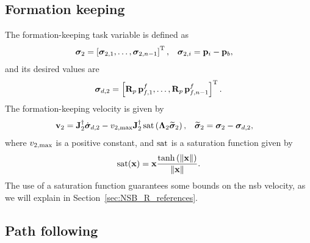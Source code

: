 \subsection{Formation keeping}
\label{sec:NSB_R_formation}
The formation-keeping task variable is defined as
\begin{align}
    \bm{\sigma}_2 &= \left[\bm{\sigma}_{2,1}, \ldots, \bm{\sigma}_{2,n-1}\right]^{\mathrm{T}}, \label{eq:NSB_R_sigma_2} &
    \bm{\sigma}_{2,i} &= \mathbf{p}_i - \mathbf{p}_b,
\end{align}
and its desired values are 
\begin{equation}
    \bm{\sigma}_{d,2} = \left[\mathbf{R}_p\,\mathbf{p}_{f,1}^f, \ldots, \mathbf{R}_p\,\mathbf{p}_{f,n-1}^f\right]^{\mathrm{T}}  .
    \label{eq:NSB_R_sigma_d_2}
\end{equation}
The formation-keeping velocity is given by 
\begin{align}
    \mathbf{v}_2 &= \mathbf{J}_2^{\dagger}\dot{\bm{\sigma}}_{d,2} - v_{2, \max}\mathbf{J}_2^{\dagger}\,{\rm sat}\left(\bm{\Lambda}_2\widetilde{\bm{\sigma}}_2\right), &
    \widetilde{\bm{\sigma}}_2 &= \bm{\sigma}_2 - \bm{\sigma}_{d, 2},
    \label{eq:NSB_R_v_form}
\end{align}
where $v_{2, \max}$ is a positive constant, and $\rm sat$ is a saturation function given by 
\begin{equation}
    {\rm sat}(\mathbf{x}) = \mathbf{x} \frac{{\rm tanh}\left(\left\|\mathbf{x}\right\|\right)}{\left\|\mathbf{x}\right\|}.
\end{equation}
The use of a saturation function guarantees some bounds on the \gls{nsb} velocity, as we will explain in Section~\ref{sec:NSB_R_references}.

\subsection{Path following}
\label{sec:NSB_R_LOS}

